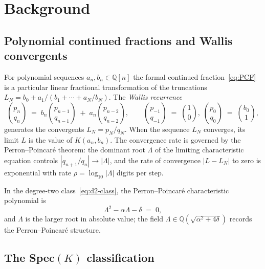 \documentclass[11pt,reqno]{amsart}
\theoremstyle{definition}
\begin{document}
\section{Background}\label{sec:background}

\subsection{Polynomial continued fractions and Wallis convergents}
\label{ssec:wallis}

For polynomial sequences $a_{n},b_{n}\in\mathbb{Q}[n]$ the
formal continued fraction~\eqref{eq:PCF} is a particular linear
fractional transformation of the truncations
$L_{N} = b_{0} + a_{1}/(b_{1}+\cdots+a_{N}/b_{N})$. The
\emph{Wallis recurrence}
\begin{equation}\label{eq:wallis}
\binom{p_{n}}{q_{n}}
\;=\;
b_{n}\binom{p_{n-1}}{q_{n-1}}
\;+\;
a_{n}\binom{p_{n-2}}{q_{n-2}},
\qquad
\binom{p_{-1}}{q_{-1}}\;=\;\binom{1}{0},\;
\binom{p_{0}}{q_{0}}\;=\;\binom{b_{0}}{1},
\end{equation}
generates the convergents $L_{N} = p_{N}/q_{N}$. When the
sequence $L_{N}$ converges, its limit $L$ is the value of
$K(a_{n},b_{n})$. The convergence rate is governed by the
Perron--Poincar\'e theorem: the dominant root $\Lambda$ of the
limiting characteristic equation controls
$|q_{n+1}/q_{n}|\to|\Lambda|$, and the rate of convergence
$|L-L_{N}|$ to zero is exponential with rate
$\rho=\log_{10}|\Lambda|$ digits per step.

In the degree-two class~\eqref{eq:d2-class}, the
Perron--Poincar\'e characteristic polynomial is
\begin{equation}\label{eq:char}
\Lambda^{2} - \alpha\Lambda - \delta \;=\; 0,
\end{equation}
and $\Lambda$ is the larger root in absolute value;
the field $\Lambda \in \mathbb{Q}(\sqrt{\alpha^{2}+4\delta})$
records the Perron--Poincar\'e structure.

\subsection{The Spec$(K)$ classification}\label{ssec:speck}
\end{document}
